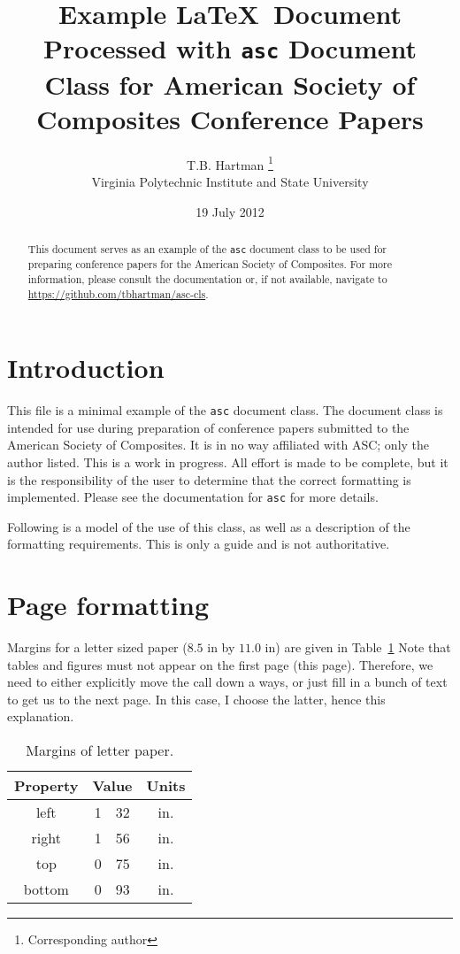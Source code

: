 \documentclass[]{asc}
\begin{document}
\title{Example \LaTeX\ Document Processed with \texttt{asc} Document Class for American Society of Composites Conference Papers}
\author{T.B. Hartman \thanks{Corresponding author} \\ Virginia Polytechnic Institute and State University}
\date{19 July 2012}

\maketitle

\begin{abstract}
    This document serves as an example of the \texttt{asc} document class to be used for preparing conference papers for the American Society of Composites.
    For more information, please consult the documentation or, if not available, navigate to \url{https://github.com/tbhartman/asc-cls}.
\end{abstract}

\section*{Introduction}

This file is a minimal example of the \texttt{asc} document class.
The document class is intended for use during preparation of conference papers submitted to the American Society of Composites.
It is in no way affiliated with ASC; only the author listed.
This is a work in progress.
All effort is made to be complete, but it is the responsibility of the user to determine that the correct formatting is implemented.
Please see the documentation for \texttt{asc} for more details.

Following is a model of the use of this class, as well as a description of the formatting requirements.
This is only a guide and is not authoritative.

\section*{Page formatting}

Margins for a letter sized paper ($8.5 \text{~in}$ by $11.0 \text{~in}$) are given in Table~\ref{tab:margins}
Note that tables and figures must not appear on the first page (this page).
Therefore, we need to either explicitly move the call down a ways, or just fill in a bunch of text to get us to the next page.
In this case, I choose the latter, hence this explanation.
\begin{table}[]
    \centering
    \caption{Margins of letter paper.}
    \begin{tabular}{|c|r@{.}l|c|}
        \hline
        Property & \multicolumn{2}{|c|}{Value} & Units \\
        \hline \hline
        left   & 1&32 & in. \\
        right  & 1&56 & in. \\
        top    & 0&75 & in. \\
        bottom & 0&93 & in. \\
        \hline
    \end{tabular}
    \label{tab:margins}
\end{table}
\end{document}

